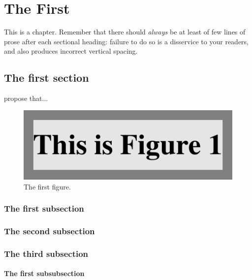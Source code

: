 
\chapter{The First}

This is a chapter.  Remember  that there should \emph{always}
be at least of few lines of prose after each sectional heading:
failure to do so is a disservice to your readers, and also
produces incorrect vertical spacing.

\section{The first section}

\blah

\citet{Kim:1999:AFC} propose that...
\begin{figure}[t]
    \centerline{\includegraphics{fig1}}
    \caption{The first figure.}%
\end{figure}

\blah

\subsection{The first subsection}

\blah

\subsection{The second subsection}

\blah

\subsection{The third subsection}

\blah

\subsubsection{The first subsubsection}

